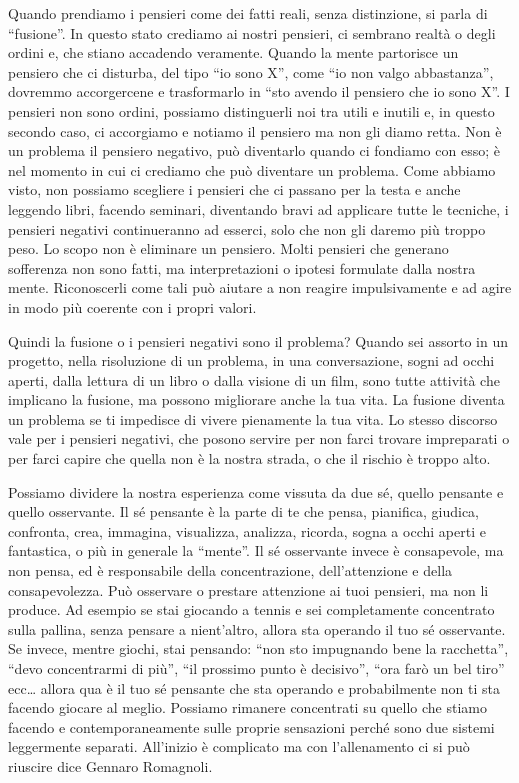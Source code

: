 \documentclass[12pt]{book} %
\begin{document}
Quando prendiamo i pensieri come dei fatti reali, senza distinzione, si parla di “fusione”. In questo stato crediamo ai
nostri pensieri, ci sembrano realtà o degli ordini e, che stiano accadendo veramente. Quando la mente
partorisce un pensiero che ci disturba, del tipo “io sono X”, come “io non valgo abbastanza”, dovremmo accorgercene e
trasformarlo in “sto avendo il pensiero che io sono X”. I pensieri non sono ordini, possiamo distinguerli noi tra utili e inutili e, in questo secondo caso, ci accorgiamo e notiamo il pensiero ma non gli diamo retta. Non è un
problema il pensiero negativo, può diventarlo quando ci fondiamo con esso; è nel momento in cui ci crediamo che può diventare un
problema. Come abbiamo visto, non possiamo scegliere i pensieri che ci passano per la testa e anche leggendo libri,
facendo seminari, diventando bravi ad applicare tutte le tecniche, i pensieri negativi continueranno ad esserci, solo
che non gli daremo più troppo peso. Lo scopo non è eliminare un pensiero. Molti pensieri che generano sofferenza non sono fatti, ma interpretazioni o ipotesi formulate dalla nostra mente. Riconoscerli come tali può aiutare a non reagire impulsivamente e ad agire in modo più coerente con i propri valori. 

Quindi la fusione o i pensieri negativi sono il problema? Quando sei assorto in un progetto, nella risoluzione di un
problema, in una conversazione, sogni ad occhi aperti, dalla lettura di un libro o dalla visione di un film, sono tutte
attività che implicano la fusione, ma possono migliorare anche la tua vita. La fusione diventa un problema se ti impedisce di vivere pienamente la tua vita. Lo stesso discorso vale per i pensieri negativi, che posono servire per non farci
trovare impreparati o per farci capire che quella non è la nostra strada, o che il rischio è troppo alto. 

Possiamo dividere la nostra esperienza come vissuta da due sé, quello pensante e quello osservante. Il sé pensante è la
parte di te che pensa, pianifica, giudica, confronta, crea, immagina, visualizza, analizza, ricorda, sogna a occhi
aperti e fantastica, o più in generale la “mente”. Il sé osservante invece è consapevole, ma non pensa, ed è
responsabile della concentrazione, dell'attenzione e della consapevolezza. Può osservare o
prestare attenzione ai tuoi pensieri, ma non li produce. Ad esempio se stai giocando a tennis e sei completamente
concentrato sulla pallina, senza pensare a nient'altro, allora sta operando il tuo sé osservante.
Se invece, mentre giochi, stai pensando: “non sto impugnando bene la racchetta”, “devo concentrarmi di più”, “il
prossimo punto è decisivo”, “ora farò un bel tiro” ecc… allora qua è il tuo sé pensante che sta operando e probabilmente non ti sta
facendo giocare al meglio. Possiamo rimanere concentrati su quello che stiamo facendo e contemporaneamente sulle proprie sensazioni perché sono due sistemi leggermente separati. All'inizio è complicato ma con l'allenamento ci si può riuscire dice Gennaro Romagnoli.
\end{document}
